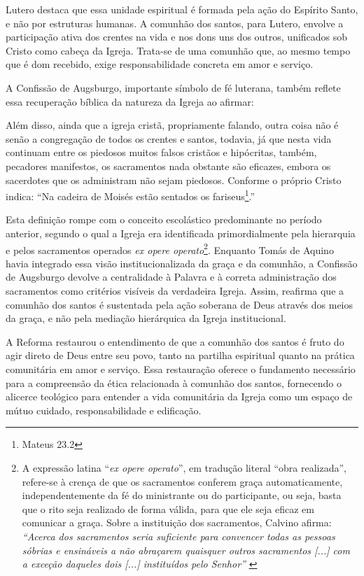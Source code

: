 Lutero destaca que essa unidade espiritual é formada pela ação do Espírito Santo, e não por estruturas humanas. A comunhão dos santos, para Lutero, envolve a participação ativa dos crentes na vida e nos dons uns dos outros, unificados sob Cristo como cabeça da Igreja. Trata-se de uma comunhão que, ao mesmo tempo que é dom recebido, exige responsabilidade concreta em amor e serviço.

A Confissão de Augsburgo, importante símbolo de fé luterana, também reflete essa recuperação bíblica da natureza da Igreja ao afirmar:
\begin{citacao}
Além disso, ainda que a igreja cristã, propriamente falando, outra coisa não é senão a congregação de todos os crentes e santos, todavia, já que nesta vida continuam entre os piedosos muitos falsos cristãos e hipócritas, também, pecadores manifestos, os sacramentos nada obstante são eficazes, embora os sacerdotes que os administram não sejam piedosos. Conforme o próprio Cristo indica: ``Na cadeira de Moisés estão sentados os fariseus\footnote{Mateus 23.2}.''\cite[Artigo VII, p. 32]{livroConcordia}
\end{citacao}

Esta definição rompe com o conceito escolástico predominante no período anterior, segundo o qual a Igreja era identificada primordialmente pela hierarquia e pelos sacramentos operados \textit{\foreignlanguage{latin}{ex opere operato}}\footnote{A expressão latina ``\textit{\foreignlanguage{latin}{ex opere operato}}'', em tradução literal ``obra realizada'', refere-se à crença de que os sacramentos conferem graça automaticamente, independentemente da fé do ministrante ou do participante, ou seja, basta que o rito seja realizado de forma válida, para que ele seja eficaz em comunicar a graça. Sobre a instituição dos sacramentos, Calvino afirma: \textit{``Acerca dos sacramentos seria suficiente para convencer todas as pessoas sóbrias e ensináveis a não abraçarem quaisquer outros sacramentos [...] com a exceção daqueles dois [...] instituídos pelo Senhor''} \cite[v. 4, Capítulo XIX, p. 2605]{calvino2022}}. Enquanto Tomás de Aquino havia integrado essa visão institucionalizada da graça e da comunhão, a Confissão de Augsburgo devolve a centralidade à Palavra e à correta administração dos sacramentos como critérios visíveis da verdadeira Igreja. Assim, reafirma que a comunhão dos santos é sustentada pela ação soberana de Deus através dos meios da graça, e não pela mediação hierárquica da Igreja institucional.

A Reforma restaurou o entendimento de que a comunhão dos santos é fruto do agir direto de Deus entre seu povo, tanto na partilha espiritual quanto na prática comunitária em amor e serviço. Essa restauração oferece o fundamento necessário para a compreensão da ética relacionada à comunhão dos santos, fornecendo o alicerce teológico para entender a vida comunitária da Igreja como um espaço de mútuo cuidado, responsabilidade e edificação.

